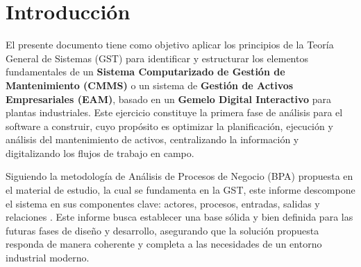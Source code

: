 \section{Introducción}

El presente documento tiene como objetivo aplicar los principios de la Teoría General de Sistemas (GST) para identificar y estructurar los elementos fundamentales de un \textbf{Sistema Computarizado de Gestión de Mantenimiento (CMMS)} o un sistema de \textbf{Gestión de Activos Empresariales (EAM)}, basado en un \textbf{Gemelo Digital Interactivo} para plantas industriales. Este ejercicio constituye la primera fase de análisis para el software a construir, cuyo propósito es optimizar la planificación, ejecución y análisis del mantenimiento de activos, centralizando la información y digitalizando los flujos de trabajo en campo.

Siguiendo la metodología de Análisis de Procesos de Negocio (BPA) propuesta en el material de estudio, la cual se fundamenta en la GST, este informe descompone el sistema en sus componentes clave: actores, procesos, entradas, salidas y relaciones \parencite{sena:fundamentos2024, ossa:2016}. Este informe busca establecer una base sólida y bien definida para las futuras fases de diseño y desarrollo, asegurando que la solución propuesta responda de manera coherente y completa a las necesidades de un entorno industrial moderno.
